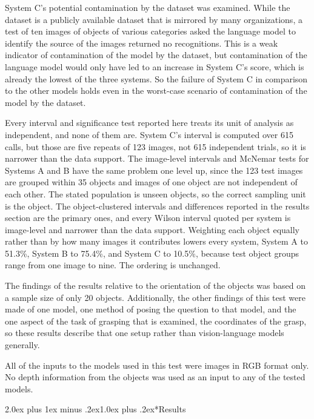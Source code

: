 \documentclass[12pt,letterpaper]{article}
\makeatletter
\renewcommand{\section}{\@startsection{section}{1}{0pt}%
  {2.0ex plus 1ex minus .2ex}{1.0ex plus .2ex}{\normalsize\bfseries}}
\makeatother
\begin{document}
System C's potential contamination by the dataset was examined. While
the dataset is a publicly available dataset that is mirrored by many
organizations, a test of ten images of objects of various categories
asked the language model to identify the source of the images returned
no recognitions. This is a weak indicator of contamination of the model
by the dataset, but contamination of the language model would only have
led to an increase in System C's score, which is already the lowest of
the three systems. So the failure of System C in comparison to the
other models holds even in the worst-case scenario of contamination of
the model by the dataset.

Every interval and significance test reported here treats its unit of
analysis as independent, and none of them are. System C's interval is
computed over 615 calls, but those are five repeats of 123 images, not
615 independent trials, so it is narrower than the data support. The
image-level intervals and McNemar tests for Systems A and B have the
same problem one level up, since the 123 test images are grouped within
35 objects and images of one object are not independent of each other.
The stated population is unseen objects, so the correct sampling unit
is the object. The object-clustered intervals and differences reported
in the results section are the primary ones, and every Wilson interval
quoted per system is image-level and narrower than the data support.
Weighting each object equally rather than by how many images it
contributes lowers every system, System A to 51.3\%, System B to
75.4\%, and System C to 10.5\%, because test object groups range from
one image to nine. The ordering is unchanged.

The findings of the results relative to the orientation of the objects
was based on a sample size of only 20 objects. Additionally, the other
findings of this test were made of one model, one method of posing the
question to that model, and the one aspect of the task of grasping that
is examined, the coordinates of the grasp, so these results describe
that one setup rather than vision-language models generally.

All of the inputs to the models used in this test were images in RGB
format only. No depth information from the objects was used as an input
to any of the tested models.

\section*{Results}
\end{document}
